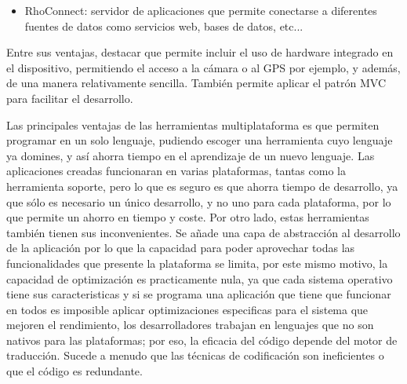 \documentclass[
10pt, %
a4paper, %
oneside, %
headinclude,footinclude, %
BCOR5mm, %
]{scrartcl}
\begin{document}
\begin{itemize}
\begin{itemize}
		\item RhoConnect: servidor de aplicaciones que permite conectarse a diferentes fuentes de datos como servicios web, bases de datos, etc...

	\end{itemize}
	Entre sus ventajas, destacar que permite incluir el uso de hardware integrado en el dispositivo, permitiendo el acceso a la cámara o al GPS por ejemplo, y además, de una manera relativamente sencilla. También permite aplicar el patrón MVC para facilitar el desarrollo.
\end{itemize} 

Las principales ventajas de las herramientas multiplataforma es que permiten programar en un solo lenguaje, pudiendo escoger una herramienta cuyo lenguaje ya domines, y así ahorra tiempo en el aprendizaje de un nuevo lenguaje. Las aplicaciones creadas funcionaran en varias plataformas, tantas como la herramienta soporte, pero lo que es seguro es que ahorra tiempo de desarrollo, ya que sólo es necesario un único desarrollo, y no uno para cada plataforma, por lo que permite un ahorro en tiempo y coste. Por otro lado, estas herramientas también tienen sus inconvenientes. Se añade una capa de abstracción al desarrollo de la aplicación por lo que la capacidad para poder aprovechar todas las funcionalidades que presente la plataforma se limita, por este mismo motivo, la capacidad de optimización es practicamente nula, ya que cada sistema operativo tiene sus caracteristicas y si se programa una aplicación que tiene que funcionar en todos es imposible aplicar optimizaciones especificas para el sistema que mejoren el rendimiento, los desarrolladores trabajan en lenguajes que no son nativos para las plataformas; por eso, la eficacia del código depende del motor de traducción. Sucede a menudo que las técnicas de codificación son ineficientes o que el código es redundante.
\end{document}
